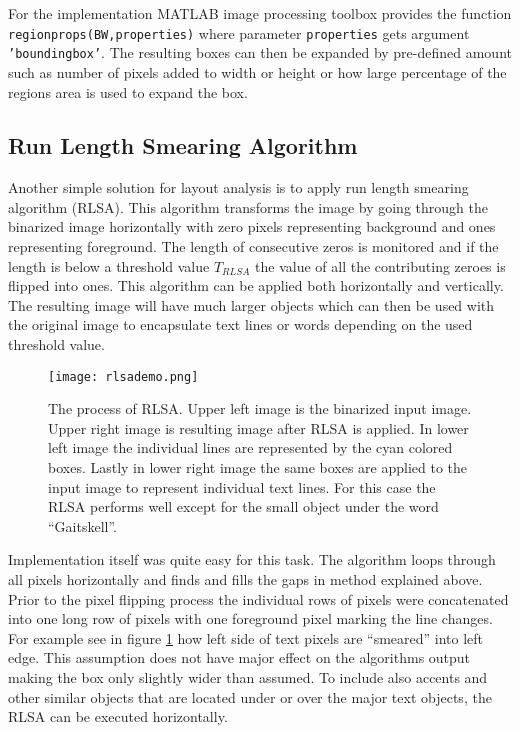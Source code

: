 \documentclass{article}
\def\code#1{\texttt{#1}}
\begin{document}
          For the implementation MATLAB image processing toolbox provides the function \code{regionprops(BW,properties)} where parameter \code{properties} gets argument \code{'boundingbox'}. The resulting boxes can then be expanded by pre-defined amount such as number of pixels added to width or height or how large percentage of the regions area is used to expand the box.

        \subsection{Run Length Smearing Algorithm}
          Another simple solution for layout analysis is to apply run length smearing algorithm (RLSA). This algorithm transforms the image by going through the binarized image horizontally with zero pixels representing background and ones representing foreground. The length of consecutive zeros is monitored and if the length is below a threshold value $T_{RLSA}$ the value of all the contributing zeroes is flipped into ones. This algorithm can be applied both horizontally and vertically. The resulting image will have much larger objects which can then be used with the original image to encapsulate text lines or words depending on the used threshold value.

          \begin{figure}[!ht]
            \centering
            \texttt{[image: rlsademo.png]}
            \caption{The process of RLSA. Upper left image is the binarized input image. Upper right image is resulting image after RLSA is applied. In lower left image the individual lines are represented by the cyan colored boxes. Lastly in lower right image the same boxes are applied to the input image to represent individual text lines. For this case the RLSA performs well except for the small object under the word ``Gaitskell''. \label{fig:workingrlsa} }
          \end{figure}

          Implementation itself was quite easy for this task. The algorithm loops through all pixels horizontally and finds and fills the gaps in method explained above. Prior to the pixel flipping process the individual rows of pixels were concatenated into one long row of pixels with one foreground pixel marking the line changes. For example see in figure \ref{fig:workingrlsa} how left side of text pixels are ``smeared'' into left edge. This assumption does not have major effect on the algorithms output making the box only slightly wider than assumed. To include also accents and other similar objects that are located under or over the major text objects, the RLSA can be executed horizontally.
\end{document}
